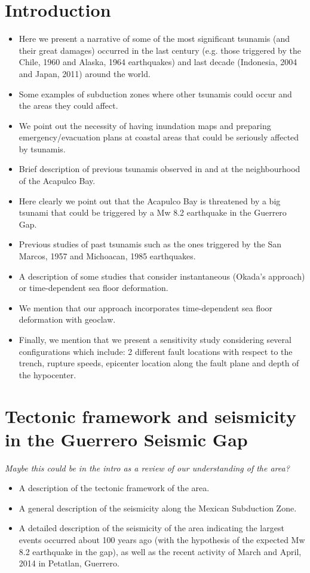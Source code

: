 \documentclass[preprint,review,12pt]{elsarticle}
\begin{document}
\section{Introduction} \label{sec:intro}

\begin{itemize}
  \item Here we present a narrative of some of the most significant tsunamis (and their great damages) occurred  in the last century (e.g. those triggered by the Chile, 1960 and Alaska, 1964 earthquakes) and last decade  (Indonesia, 2004 and Japan, 2011) around the world.
   \item Some examples of subduction zones where other tsunamis could occur and the areas they could affect.
  \item We point out the necessity of having inundation maps and preparing emergency/evacuation plans at coastal areas that could be seriously affected by tsunamis.
  \item Brief description of previous tsunamis observed in and at the neighbourhood of the Acapulco Bay.
  \item Here clearly we point out that the Acapulco Bay is threatened by a big tsunami that could be triggered by a Mw 8.2 earthquake in the Guerrero Gap.
  \item Previous studies of past tsunamis such as the ones triggered by the San Marcos, 1957 and Michoacan, 1985 earthquakes.
  \item A description of some studies that consider instantaneous (Okada's approach) or time-dependent sea floor deformation. 
  \item We mention that our approach incorporates time-dependent sea floor deformation with geoclaw.
  \item Finally, we mention that we present a sensitivity study considering several configurations which include: 2 different fault locations with respect to the trench, rupture speeds, epicenter location along the fault plane and depth of the hypocenter.
\end{itemize}

       
\section{Tectonic framework and seismicity in the Guerrero Seismic Gap} \label{sec:tectonic_guerrero_gap}
\emph{Maybe this could be in the intro as a review of our understanding of the area?}

\begin{itemize}
  \item A description of the tectonic framework of the area.
  \item A general description of the seismicity along the Mexican Subduction Zone.
  \item A detailed description of the seismicity of the area indicating the largest events occurred about 100 years ago (with the hypothesis of the expected Mw 8.2 earthquake in the gap), as well as the recent activity of March and April, 2014 in Petatlan, Guerrero.
\end{itemize}
\end{document}
